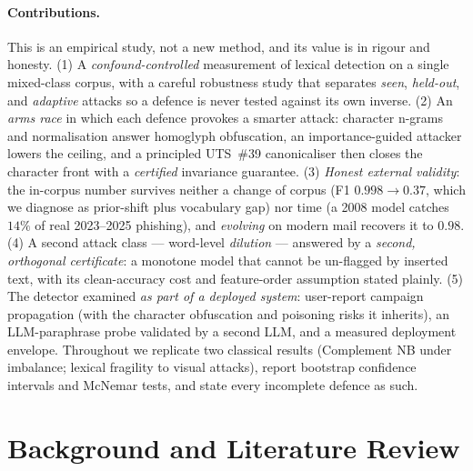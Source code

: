 \documentclass[11pt]{article}
\begin{document}
\paragraph{Contributions.} This is an empirical study, not a new method, and its value is
in rigour and honesty. (1) A \emph{confound-controlled} measurement of lexical detection on a
single mixed-class corpus, with a careful robustness study that separates \emph{seen},
\emph{held-out}, and \emph{adaptive} attacks so a defence is never tested against its own
inverse. (2) An \emph{arms race} in which each defence provokes a smarter attack: character
n-grams and normalisation answer homoglyph obfuscation, an importance-guided attacker lowers
the ceiling, and a principled UTS~\#39 canonicaliser then closes the character front with a
\emph{certified} invariance guarantee. (3) \emph{Honest external validity}: the in-corpus
number survives neither a change of corpus (F1 $0.998\rightarrow0.37$, which we diagnose as
prior-shift plus vocabulary gap) nor time (a 2008 model catches $14\%$ of real 2023--2025
phishing), and \emph{evolving} on modern mail recovers it to $0.98$. (4) A second attack class
--- word-level \emph{dilution} --- answered by a \emph{second, orthogonal certificate}: a
monotone model that cannot be un-flagged by inserted text, with its clean-accuracy cost and
feature-order assumption stated plainly. (5) The detector examined \emph{as part of a deployed
system}: user-report campaign propagation (with the character obfuscation and poisoning risks
it inherits), an LLM-paraphrase probe validated by a second LLM, and a measured deployment
envelope. Throughout we replicate two classical results (Complement NB under imbalance; lexical
fragility to visual attacks), report bootstrap confidence intervals and McNemar tests, and
state every incomplete defence as such.

\section{Background and Literature Review}
\end{document}
